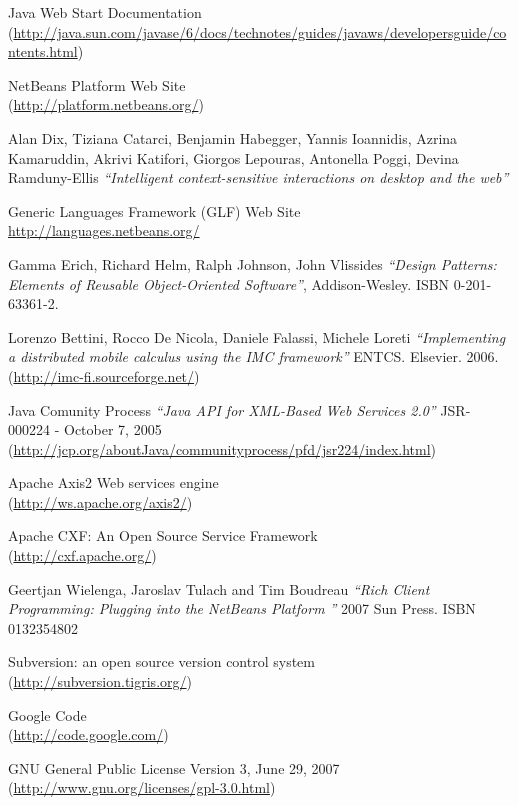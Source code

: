 \begin{thebibliography}{99}
 Java Web Start Documentation \\
(\href{http://java.sun.com/javase/6/docs/technotes/guides/javaws/developersguide/contents.html}{http://java.sun.com/javase/6/docs/technotes/guides/javaws/developersguide/contents.html})

 NetBeans Platform Web Site \\
(\href{http://platform.netbeans.org/}{http://platform.netbeans.org/})

 Alan Dix, Tiziana Catarci, Benjamin Habegger,
Yannis Ioannidis, Azrina Kamaruddin, Akrivi Katifori, Giorgos Lepouras, Antonella Poggi, Devina Ramduny-Ellis
\emph{``Intelligent context-sensitive interactions on desktop and the web''}

 Generic Languages Framework (GLF) Web Site \\
\href{http://languages.netbeans.org/}{http://languages.netbeans.org/}

 Gamma Erich, Richard Helm, Ralph Johnson, John Vlissides
\emph{``Design Patterns: Elements of Reusable Object-Oriented Software''},
Addison-Wesley. ISBN 0-201-63361-2.

 Lorenzo Bettini, Rocco De Nicola, Daniele Falassi, Michele Loreti
\emph{``Implementing a distributed mobile calculus using the IMC framework''}
ENTCS. Elsevier. 2006.\\
(\href{http://imc-fi.sourceforge.net/}{http://imc-fi.sourceforge.net/})

 Java Comunity Process \emph{``Java API for XML-Based Web
Services 2.0''} JSR-000224 - October 7, 2005\\
(\href{http://jcp.org/aboutJava/communityprocess/pfd/jsr224/index.html}{http://jcp.org/aboutJava/communityprocess/pfd/jsr224/index.html})

 Apache Axis2 Web services engine \\
(\href{http://ws.apache.org/axis2/}{http://ws.apache.org/axis2/})

 Apache CXF: An Open Source Service Framework \\
(\href{http://cxf.apache.org/}{http://cxf.apache.org/})

 Geertjan Wielenga, Jaroslav Tulach and Tim Boudreau
\emph{``Rich Client Programming: Plugging into the NetBeans Platform ''} 2007
Sun Press. ISBN 0132354802

 Subversion: an open source version control system \\
(\href{http://subversion.tigris.org/}{http://subversion.tigris.org/})

 Google Code \\
(\href{http://code.google.com/}{http://code.google.com/})

 GNU General Public License Version 3, June 29, 2007\\ 
(\href{http://www.gnu.org/licenses/gpl-3.0.html}{http://www.gnu.org/licenses/gpl-3.0.html})

\end{thebibliography} 